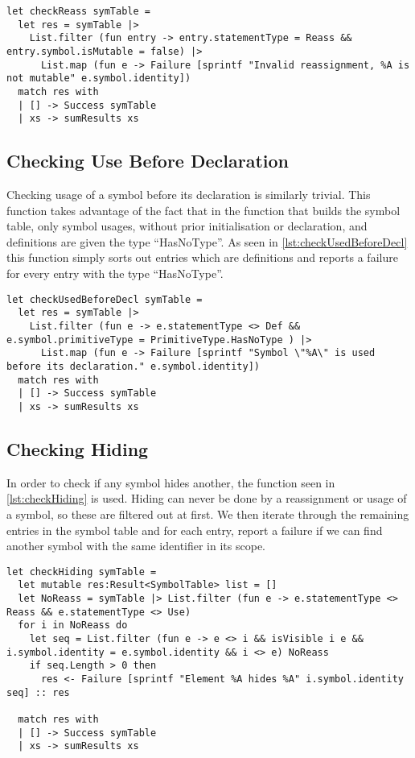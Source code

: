\begin{lstlisting}[style = fsharp, label = lst:checkReass, caption = {The function responsible for checking illegal reassignments.}]
let checkReass symTable = 
  let res = symTable |> 
    List.filter (fun entry -> entry.statementType = Reass && entry.symbol.isMutable = false) |>
      List.map (fun e -> Failure [sprintf "Invalid reassignment, %A is not mutable" e.symbol.identity])
  match res with
  | [] -> Success symTable
  | xs -> sumResults xs
\end{lstlisting}

\subsection{Checking Use Before Declaration}
Checking usage of a symbol before its declaration is similarly trivial. This function takes advantage of the fact that in the function that builds the symbol table, only symbol usages, without prior initialisation or declaration, and definitions are given the type \enquote{HasNoType}. 
As seen in \cref{lst:checkUsedBeforeDecl} this function simply sorts out entries which are definitions and reports a failure for every entry with the type \enquote{HasNoType}.
\begin{lstlisting}[style = fsharp, label = lst:checkUsedBeforeDecl, caption = {The function responsible for checking usage before declaration.}]
let checkUsedBeforeDecl symTable =
  let res = symTable |>
    List.filter (fun e -> e.statementType <> Def && e.symbol.primitiveType = PrimitiveType.HasNoType ) |>
      List.map (fun e -> Failure [sprintf "Symbol \"%A\" is used before its declaration." e.symbol.identity])
  match res with
  | [] -> Success symTable
  | xs -> sumResults xs
\end{lstlisting}

\subsection{Checking Hiding}
In order to check if any symbol hides another, the function seen in \cref{lst:checkHiding} is used. Hiding can never be done by a reassignment or usage of a symbol, so these are filtered out at first. We then iterate through the remaining entries in the symbol table and for each entry, report a failure if we can find another symbol with the same identifier in its scope.

\begin{lstlisting}[style = fsharp, label = lst:checkHiding, caption = {The function responsible for checking hiding.}]
let checkHiding symTable =
  let mutable res:Result<SymbolTable> list = []
  let NoReass = symTable |> List.filter (fun e -> e.statementType <> Reass && e.statementType <> Use)
  for i in NoReass do
    let seq = List.filter (fun e -> e <> i && isVisible i e && i.symbol.identity = e.symbol.identity && i <> e) NoReass
    if seq.Length > 0 then 
      res <- Failure [sprintf "Element %A hides %A" i.symbol.identity seq] :: res

  match res with
  | [] -> Success symTable
  | xs -> sumResults xs
\end{lstlisting}

